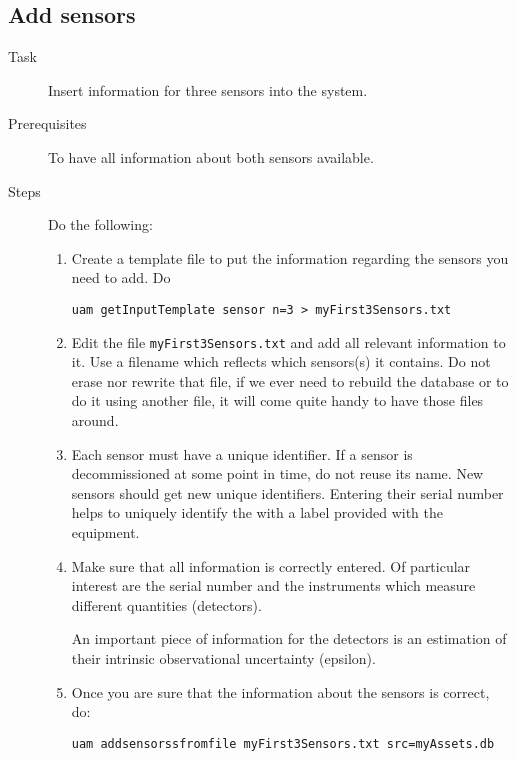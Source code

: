 \documentclass[12pt]{amsart}
\begin{document}
\subsection{Add sensors}
\begin{description}
\item[Task] Insert information for three sensors into the system.

\item[Prerequisites] To have all information about both sensors available.

\item[Steps] Do the following:

\begin{enumerate}
\item Create a template file to put the information regarding the sensors you need to add. Do

\begin{verbatim}
uam getInputTemplate sensor n=3 > myFirst3Sensors.txt
\end{verbatim}

\item Edit the file  {\tt myFirst3Sensors.txt} and add all relevant
information to it. Use a filename which reflects which sensors(s) it
contains.
Do not erase nor rewrite that file, if we ever need to rebuild the database or to do it using another file, it will come quite handy to have those files around.

\item Each sensor must have a unique identifier. If a sensor is
decommissioned at some point in time, do not reuse its name. New sensors
should get new unique identifiers. Entering their serial number helps to
uniquely identify the with a label provided with the equipment.

\item Make sure that all information is correctly entered. Of particular
interest are the serial number and the instruments which measure different
quantities (detectors). 

An important piece of information for the detectors is an estimation
of their intrinsic observational uncertainty (epsilon).

\item Once you are sure that the information about the sensors is correct, do:

\begin{verbatim}
uam addsensorssfromfile myFirst3Sensors.txt src=myAssets.db
\end{verbatim}


\end{enumerate}
\end{description}
\end{document}
